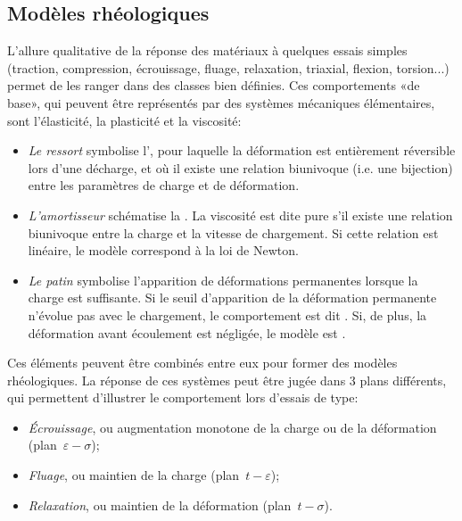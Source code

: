 
\medskip
\subsection{Modèles rhéologiques}

L'allure qualitative de la réponse des matériaux à quelques essais simples (traction, compression, écrouissage, fluage, relaxation, triaxial, flexion, torsion...) permet de les ranger dans des classes bien définies. Ces comportements «de base», qui peuvent être représentés par des systèmes mécaniques élémentaires, sont l'élasticité, la plasticité et la viscosité:
\begin{itemize}
  \item \emph{Le ressort} symbolise l', pour laquelle la déformation est entièrement réversible lors d'une décharge, et où il existe une relation biunivoque (i.e. une bijection) entre les paramètres de charge et de déformation.
  \item \emph{L'amortisseur} schématise la .
	La viscosité est dite pure s'il existe une relation biunivoque entre la charge et la vitesse de chargement. Si cette relation est linéaire, 	le modèle correspond à la loi de Newton. 
  \item \emph{Le patin} symbolise l'apparition de déformations permanentes lorsque la
	charge est suffisante.
	Si le seuil d'apparition de la déformation permanente n'évolue pas avec le chargement, le comportement est dit .
	Si, de plus, la déformation avant écoulement est négligée, le modèle est
	.
\end{itemize}
\medskipvm
Ces éléments peuvent être combinés entre eux pour former des modèles rhéologiques. La réponse de ces systèmes peut être jugée dans 3 plans différents, qui permettent d'illustrer le comportement lors d'essais de type:
\begin{itemize}
  \item \emph{Écrouissage}, ou augmentation monotone de la charge ou de la déformation
	(plan~$\varepsilon-\sigma$);
  \item \emph{Fluage}, ou maintien de la charge (plan~$t-\varepsilon$);
  \item \emph{Relaxation}, ou maintien de la déformation (plan~$t-\sigma$).
\end{itemize}
